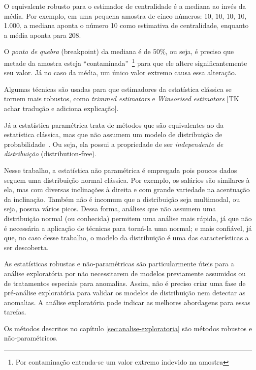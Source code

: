 \documentclass[12pt,a4paper]{article}
\begin{document}
O equivalente robusto para o estimador de centralidade é a mediana ao invés da média. Por exemplo, em uma pequena amostra de cinco números: 10, 10, 10, 10, 1.000, a mediana aponta o número 10 como estimativa de centralidade, enquanto a média aponta para 208.

O \textit{ponto de quebra} (breakpoint) da mediana é de 50\%, ou seja, é preciso que metade da amostra esteja \enquote{contaminada}~\footnote{Por contaminação entenda-se um valor extremo indevido na amostra} para que ele altere significantemente seu valor. Já no caso da média, um único valor extremo causa essa alteração.

Algumas técnicas são usadas para que estimadores da estatística clássica se tornem mais robustos, como \textit{trimmed estimators} e \textit{Winsorised estimators} [TK achar tradução e adiciona explicação].

Já a estatística paramétrica trata de métodos que são equivalentes ao da estatística clássica, mas que não assumem um modelo de distribuição de probabilidade~\cite{Hollander2013-mq}. Ou seja, ela possui a propriedade de ser \textit{independente de distribuição} (distribution-free). 

Nesse trabalho, a estatística não paramétrica é empregada pois poucos dados seguem uma distribuição normal clássica. Por exemplo, os salários são similares à ela, mas com diversas inclinações à direita e com grande variedade na acentuação da inclinação. Também não é incomum que a distribuição seja multimodal, ou seja, possua vários picos. Dessa forma, análises que não assumem uma distribuição normal (ou conhecida) permitem uma análise mais rápida, já que não é necessária a aplicação de técnicas para torná-la uma normal; e mais confiável, já que, no caso desse trabalho, o modelo da distribuição é uma das características a ser descoberta.~

As estatísticas robustas e não-paramétricas são particularmente úteis para a análise exploratória por não necessitarem de modelos previamente assumidos ou de tratamentos especiais para anomalias. Assim, não é preciso criar uma fase de pré-análise exploratória para validar os modelos de distribuição nem detectar as anomalias. A análise exploratória pode indicar as melhores abordagens para essas tarefas. 

Os métodos descritos no capítulo \ref{sec:analise-exploratoria} são métodos robustos e não-paramétricos.

\end{document}
